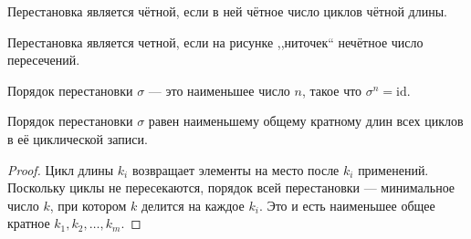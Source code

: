 \begin{corollary}
    Перестановка является чётной, если в ней чётное число циклов чётной длины.
\end{corollary}
\begin{proposition}
    Перестановка является четной, если на рисунке ,,ниточек`` нечётное число пересечений.
\end{proposition}


\begin{definition}
    Порядок перестановки $\sigma$ --- это наименьшее число $n$, такое что \(
        \sigma^n = \text{id}.
    \)
\end{definition}


\begin{theorem}
    Порядок перестановки $\sigma$ равен наименьшему общему кратному длин всех циклов в её циклической записи.
\end{theorem}
\begin{proof}
    Цикл длины $k_i$ возвращает элементы на место после $k_i$ применений. Поскольку циклы не пересекаются, порядок всей перестановки — минимальное число $k$, при котором $k$ делится на каждое $k_i$.  
    Это и есть наименьшее общее кратное $k_1, k_2, \dots, k_m$.
\end{proof}
